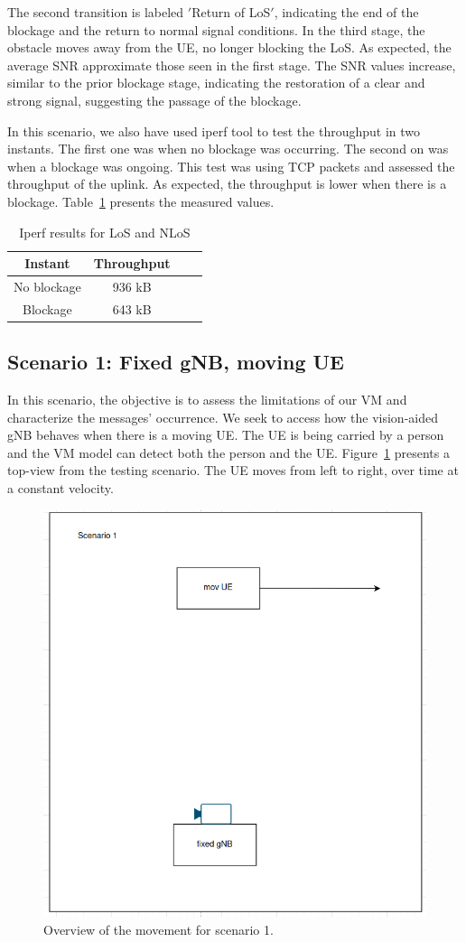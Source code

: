 The second transition is labeled \('\)Return of LoS\('\), indicating the end of the blockage and the return to normal signal conditions.
In the third stage, the obstacle moves away from the UE, no longer blocking the LoS\@.
As expected, the average SNR approximate those seen in the first stage.
The SNR values increase, similar to the prior blockage stage, indicating the restoration of a clear and strong signal, suggesting the passage of the blockage.

In this scenario, we also have used iperf tool to test the throughput in two instants.
The first one was when no blockage was occurring.
The second on was when a blockage was ongoing.
This test was using TCP packets and assessed the throughput of the uplink.
As expected, the throughput is lower when there is a blockage.
Table~\ref{tab:iperf} presents the measured values.


\begin{table}[h]
    \centering %
    \begin{tabular}{|c|c|c|c|}
        \hline
        \textbf{Instant} & \textbf{Throughput} \\ \hline
        No blockage & 936 kB \\ \hline
        Blockage   &  643 kB\\ \hline
    \end{tabular}
    \caption{Iperf results for LoS and NLoS} %
    \label{tab:iperf} %
\end{table}


\subsection{Scenario 1: Fixed gNB, moving UE}\label{subsec:scenario-0.1:-fixed-gnb-moving-ue}

In this scenario, the objective is to assess the limitations of our VM and characterize the messages' occurrence\@.
We seek to access how the vision-aided gNB behaves when there is a moving UE\@.
The UE is being carried by a person and the VM model can detect both the person and the UE\@.
Figure~\ref{fig:test_movUE} presents a top-view from the testing scenario.
The UE moves from left to right, over time at a constant velocity.

\begin{figure}[H]
    \centering
    \includegraphics[width=0.5\linewidth]{figures/scenario1}
    \caption{Overview of the movement for scenario 1.}
    \label{fig:test_movUE}
\end{figure}

